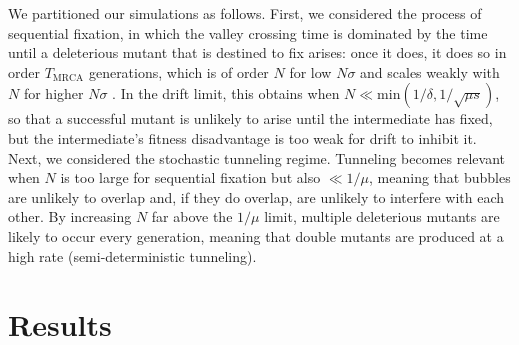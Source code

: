 \documentclass[rmp]{revtex4}
\begin{document}
We partitioned our simulations as follows.
First, we considered the process of sequential fixation, in which the valley crossing time is dominated by the time until a deleterious mutant that is destined to fix arises: once it does, it does so in order $T_{\mathrm{MRCA}}$ generations, which is of order $N$ for low $N\sigma$ and scales weakly with $N$ for higher $N\sigma$ \citep{neher_hallatschek_2013}.
In the drift limit, this obtains when $N \ll \mathrm{min}(1/\delta, 1/\sqrt{\mu s})$, so that a successful mutant is unlikely to arise until the intermediate has fixed, but the intermediate's fitness disadvantage is too weak for drift to inhibit it.
Next, we considered the stochastic tunneling regime.
Tunneling becomes relevant when $N$ is too large for sequential fixation but also $\ll 1/\mu$, meaning that bubbles are unlikely to overlap and, if they do overlap, are unlikely to interfere with each other.
By increasing $N$ far above the $1/\mu$ limit, multiple deleterious mutants are likely to occur every generation, meaning that double mutants are produced at a high rate (semi-deterministic tunneling).

\section*{Results}
\end{document}
